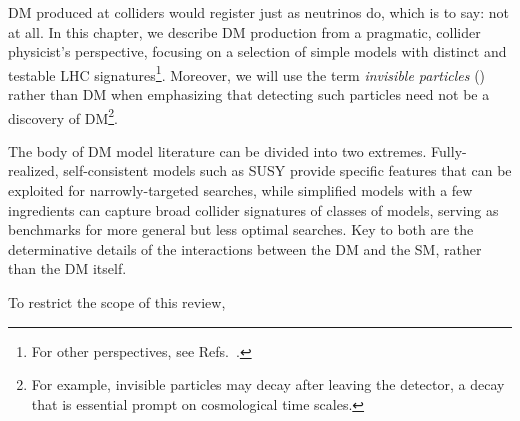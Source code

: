 DM produced at colliders would register just as neutrinos do, which is to say: not at all. 
In this chapter, we describe DM production from a pragmatic, collider physicist's perspective, focusing on a selection of simple models with distinct and testable LHC signatures\footnote{For other perspectives, see Refs.~\cite{Kahlhoefer:2017dnp,Abercrombie:2015wmb,Arcadi:2017kky,Feng:2010gw}.}.
Moreover, we will use the term {\it invisible particles} (\IP) rather than DM when emphasizing that detecting such particles need not be a discovery of DM\footnote{For example, invisible particles may decay after leaving the detector, a decay that is essential prompt on cosmological time scales.}.


The body of DM model literature can be divided into two extremes.%
Fully-realized, self-consistent models such as SUSY provide specific features that can be exploited for narrowly-targeted searches, while simplified models with a few ingredients can capture broad collider signatures of classes of models, serving as benchmarks for more general but less optimal searches.
Key to both are the determinative details of the interactions between the DM and the SM, rather than the DM itself.




To restrict the scope of this review,



